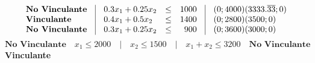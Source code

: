 \documentclass[12pt]{article}
\begin{document}
\begin{center}
\[
\begin{array}{c|c|c}
  \begin{array}{l}
    \textbf{No Vinculante} \\
    \textbf{Vinculante} \\
    \textbf{No Vinculante} 
  \end{array}
  &
  \begin{array}{l c r}
    0.3x_1 + 0.25x_2 & \leq & 1000 \\
    0.4x_1 + 0.5x_2 & \leq & 1400 \\
    0.3x_1 + 0.25x_2 & \leq & 900 
  \end{array}
  &
  \begin{array}{l}
    (0; 4000) (3333.\overline{33}; 0) \\
    (0; 2800) (3500; 0) \\
    (0; 3600) (3000; 0) \\
  \end{array}
\end{array}
\]
\[\textbf{No Vinculante} \quad x_1 \leq 2000 \quad | \quad x_2 \leq 1500 \quad | \quad x_1 + x_2 \leq 3200 \quad \textbf{No Vinculante}\]
\hspace{-0.75cm}\textbf{Vinculante}
\end{center}
\end{document}
